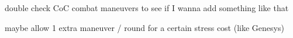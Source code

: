 {{    %
    
    \item double check CoC combat maneuvers to see if I wanna add something like that    
    \item maybe allow 1 extra maneuver / round for a certain stress cost (like Genesys)
}
    
}

